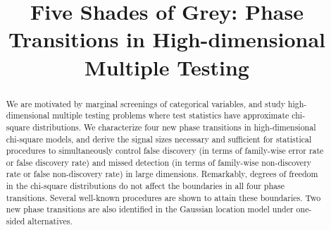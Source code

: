 \documentclass[aos, preprint]{imsart}
\numberwithin{equation}{section}
\theoremstyle{plain}
\theoremstyle{definition}
\theoremstyle{remark}
\begin{document}
\begin{frontmatter}
\title{\Large{Five Shades of Grey: Phase Transitions in High-dimensional Multiple Testing}} %

\begin{aug}
\author{ }

\address{Department of Statistics, University of Michigan, Ann Arbor, USA\\
}



\end{aug}

\begin{abstract}
We are motivated by marginal screenings of categorical variables, and study high-dimensional multiple testing problems where test statistics have approximate chi-square distributions.
We characterize four new phase transitions in high-dimensional chi-square models, and derive the signal sizes necessary and sufficient for statistical procedures to simultaneously control false discovery (in terms of family-wise error rate or false discovery rate) and missed detection (in terms of family-wise non-discovery rate or false non-discovery rate) in large dimensions.
Remarkably, degrees of freedom in the chi-square distributions do not affect the boundaries in all four phase transitions.
Several well-known procedures are shown to attain these boundaries.
Two new phase transitions are also identified in the Gaussian location model under one-sided alternatives.


\end{abstract}
\end{frontmatter}
\end{document}
